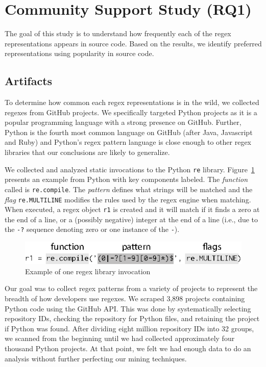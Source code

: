 
\section{Community Support Study (RQ1)}
\label{communitystudy}
The goal of this study is to understand how frequently each of the regex representations appears in source code. Based on the results, we identify preferred representations using popularity in source code. 



\subsection{Artifacts}
To determine how common each regex representations is in the wild, we collected
regexes from GitHub projects. We specifically targeted Python projects as it is a popular programming language with a strong presence on GitHub. Further, Python is the fourth most common language on GitHub (after Java, Javascript and Ruby) and Python's regex pattern
language is close enough to other regex libraries that our conclusions are likely to generalize.

We collected and analyzed static invocations to the Python {\tt re} library. 
Figure~\ref{fig:exampleUsage} presents an example  from Python  with key components labeled. The \emph{function} called is {\tt re.compile}.  
The \emph{pattern} defines what strings will be matched and the \emph{flag} {\tt re.MULTILINE} modifies the rules used by the regex engine when matching. 
When executed, a regex object {\tt r1} is created  
and it will  match if it finds a zero at the end of a line, or a (possibly negative) integer at the end of a line (i.e., due to the {\tt -?} sequence denoting zero or one instance of the {\tt -}).

\begin{figure}[tb]
\centering
\includegraphics[width=\columnwidth]{illustrations/exampleUsage.eps}
\vspace{-12pt}
\caption{Example of one regex library invocation}
\vspace{-6pt}
\label{fig:exampleUsage}
\end{figure}

Our goal was to collect regex patterns from a variety of projects to represent the breadth of how developers use regexes. 
We scraped 3,898 projects containing Python code using the GitHub API. This was done by systematically selecting repository IDs, checking the repository for Python files, and retaining the project if Python was found. After dividing eight million repository IDs into 32 groups, we scanned from the beginning until we had collected approximately four thousand Python projects. 
At that point, we felt we had enough data
to do an analysis without further perfecting our mining techniques. 

